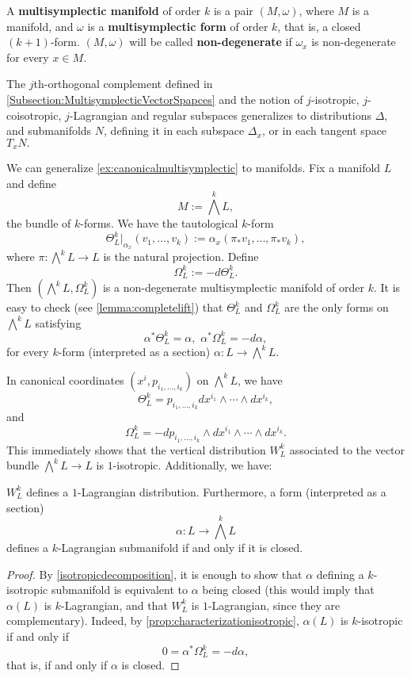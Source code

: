 \begin{Def} A \textbf{multisymplectic manifold} of order $k$ is a pair $(M, \omega)$, where $M$ is a manifold, and $\omega$ is a \textbf{multisymplectic form} of order $k$, that is, a closed $(k +1)$-form. $(M, \omega)$ will be called \textbf{non-degenerate} if $\omega_x$ is non-degenerate for every $x \in M$.
\end{Def}

The $j$th-orthogonal complement defined in \cref{Subsection:MultisymplecticVectorSpapces} and the notion of $j$-isotropic, $j$-coisotropic, $j$-Lagrangian and regular subspaces generalizes to distributions $\Delta$, and submanifolds $N$, defining it in each subspace $\Delta_x$, or in each tangent space $T_x N.$

\begin{example} \label{ex:formsmanifold}We can generalize \cref{ex:canonicalmultisymplectic} to manifolds. Fix a manifold $L$ and define $$M:= \bigwedge^k L,$$ the bundle of $k$-forms. We have the tautological $k$-form $$\Theta^k_L|_{\alpha_x}(v_1, \dots, v_k):= \alpha_x(\pi_\ast v_1, \dots, \pi_\ast v_k),$$ where $\pi: \bigwedge^k L \rightarrow L$ is the natural projection. Define $$\Omega^k_L := - d\Theta^k_L.$$ Then $(\bigwedge^k L, \Omega^k_L)$ is a non-degenerate multisymplectic manifold of order $k$. It is easy to check (see \cref{lemma:completelift}) that $\Theta^k_L$ and $\Omega^k_L$ are the only forms on $\bigwedge^k L$ satisfying $$\alpha^\ast \Theta^k_L = \alpha, \,\, \alpha^\ast \Omega^k_L = - d \alpha,$$ for every $k$-form (interpreted as a section) $\alpha: L \rightarrow \bigwedge^k L$.
\end{example}

 In canonical coordinates $(x^i, p_{i_1, \dots, i_k})$ on $\bigwedge^k L$, we have $$\Theta^k_L = p_{i_1, \dots, i_k} d x^{i_1} \wedge \cdots \wedge dx^{i_k},$$ and $$\Omega^k_L = -dp_{i_1, \dots, i_k} \wedge d x^{i_1} \wedge \cdots \wedge dx^{i_k}.$$ This immediately shows that the vertical distribution $W_L^k$ associated to the vector bundle $\bigwedge^k L \rightarrow L$ is $1$-isotropic. Additionally, we have:

 \begin{proposition}\label{prop:KLagrangianclosed} $W_L^k$ defines a $1$-Lagrangian distribution. Furthermore, a form (interpreted as a section) $$\alpha: L \rightarrow \bigwedge^k L$$ defines a $k$-Lagrangian submanifold if and only if it is closed.
 \end{proposition}
 \begin{proof} By \cref{isotropicdecomposition}, it is enough to show that $\alpha$ defining a $k$-isotropic submanifold is equivalent to $\alpha$ being closed (this would imply that $\alpha(L)$ is $k$-Lagrangian, and that $W^k_L$ is $1$-Lagrangian, since they are complementary). Indeed, by \cref{prop:characterizationisotropic}, $\alpha(L)$ is $k$-isotropic if and only if $$ 0 = \alpha^\ast \Omega^k_L = - d \alpha, $$ that is, if and only if $\alpha$ is closed.
 \end{proof}


